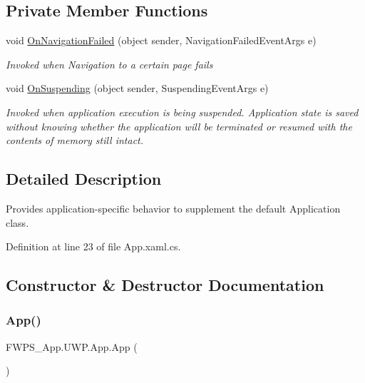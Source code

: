 \subsection*{Private Member Functions}
\begin{DoxyCompactItemize}
\item 
void \mbox{\hyperlink{class_f_w_p_s___app_1_1_u_w_p_1_1_app_a0e7d1f272507c7d43adcad3384240995}{On\+Navigation\+Failed}} (object sender, Navigation\+Failed\+Event\+Args e)
\begin{DoxyCompactList}\small\item\em Invoked when Navigation to a certain page fails \end{DoxyCompactList}\item 
void \mbox{\hyperlink{class_f_w_p_s___app_1_1_u_w_p_1_1_app_a66a0e5da76b45b9b3c1e77b3a84fc423}{On\+Suspending}} (object sender, Suspending\+Event\+Args e)
\begin{DoxyCompactList}\small\item\em Invoked when application execution is being suspended. Application state is saved without knowing whether the application will be terminated or resumed with the contents of memory still intact. \end{DoxyCompactList}\end{DoxyCompactItemize}


\subsection{Detailed Description}
Provides application-\/specific behavior to supplement the default Application class. 



Definition at line 23 of file App.\+xaml.\+cs.



\subsection{Constructor \& Destructor Documentation}
\mbox{\label{class_f_w_p_s___app_1_1_u_w_p_1_1_app_a0ca7ede8a2837a53154f23c194dd2cd4}} 
\subsubsection{\texorpdfstring{App()}{App()}}
{\footnotesize\ttfamily F\+W\+P\+S\+\_\+\+App.\+U\+W\+P.\+App.\+App (\begin{DoxyParamCaption}{ }\end{DoxyParamCaption})}



